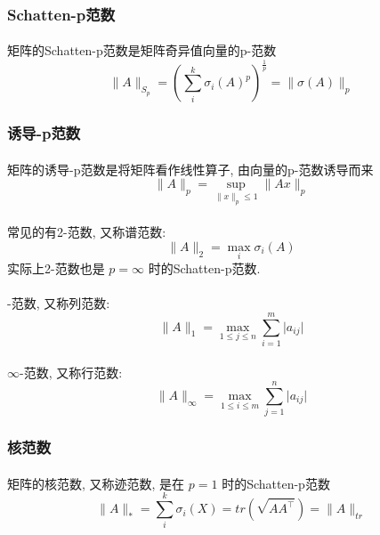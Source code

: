\documentclass[a4paper, UTF8]{ctexart}				%
\numberwithin{equation}{section}				%
\newcommand{\upcite}[1]{\textsuperscript{\textsuperscript{\cite{#1}}}}
\begin{document}
			\subsubsection{Schatten-p范数}
				\paragraph{}
					\quad 矩阵的Schatten-p范数是矩阵奇异值向量的p-范数\upcite{schatten2013norm}
					\[
							\lVert{A}\rVert_{S_p}
						=	(\sum_i^k \sigma_i(A)^p)^{\frac{1}{p}}
						=	\lVert{\sigma(A)}\rVert_p
					\]

			\subsubsection{诱导-p范数}
				\paragraph{}
					\quad 矩阵的诱导-p范数\upcite{meyer2000matrix}是将矩阵看作线性算子, 由向量的p-范数诱导而来
					\[
						\lVert{A}\rVert_p = \sup_{\lVert{x}\rVert_p \leq 1}\lVert{Ax}\rVert_p
					\]

				\paragraph{}
					\quad 常见的有2-范数, 又称谱范数:
					\[
						\lVert{A}\rVert_2 = \max_i \sigma_i(A)
					\]
					实际上2-范数也是 $p = \infty$ 时的Schatten-p范数.

				\paragraph{}
					-范数, 又称列范数:
					\[
						\lVert{A}\rVert_1 = \max_{1 \leq j \leq n}\sum_{i = 1}^m \lvert{a_{ij}}\rvert
					\]

				\paragraph{}
					\quad $\infty$-范数, 又称行范数:
					\[
						\lVert{A}\rVert_\infty = \max_{1 \leq i \leq m}\sum_{j = 1}^n \lvert{a_{ij}}\rvert
					\]
			
			\subsubsection{核范数}
				\paragraph{}
					\quad 矩阵的核范数, 又称迹范数, 是在 $p = 1$ 时的Schatten-p范数\upcite{meyer2000matrix}
					\[
							\lVert{A}\rVert_*
						=	\sum_i^k \sigma_i(X)
						=	tr(\sqrt{A A^\top})
						=	\lVert{A}\rVert_{tr}
					\]
\end{document}
